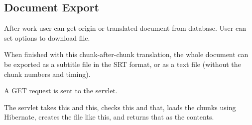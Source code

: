 \subsection{Document Export}

After work user can get origin or translated document from database.  User can set options to download file.
  



When finished with this chunk-after-chunk translation, the whole document can be exported as a subtitle file in the SRT format, or as a text file (without the chunk numbers and timing).

A GET request is sent to the servlet.

The servlet takes this and this, checks this and that, loads the chunks using Hibernate, creates the file like this, and returns that as the contents.

